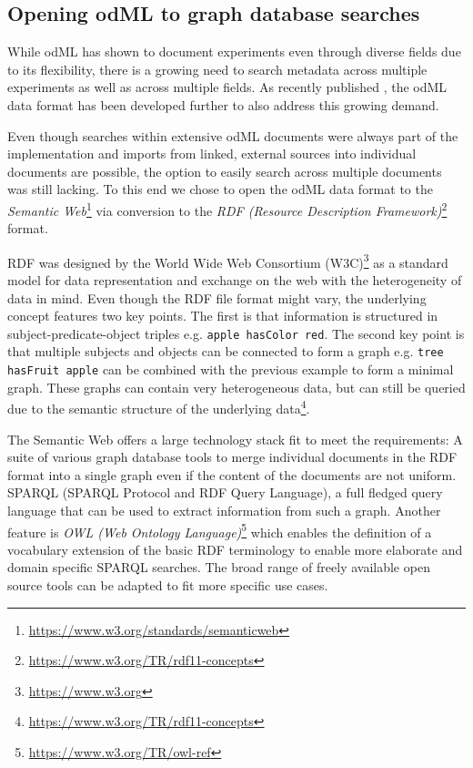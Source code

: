 \documentclass{article}
\begin{document}
\subsection{Opening odML to graph database searches} \label{sec:why_rdf}

While odML has shown to document experiments even through diverse fields due to its flexibility, there is a growing need to search metadata across multiple experiments as well as across multiple fields. As recently published \cite{Sprenger_2019}, the odML data format has been developed further to also address this growing demand.

Even though searches within extensive odML documents were always part of the implementation and imports from linked, external sources into individual documents are possible, the option to easily search across multiple documents was still lacking. To this end we chose to open the odML data format to the \textit{Semantic Web}\footnote{\url{https://www.w3.org/standards/semanticweb}} via conversion to the \textit{RDF (Resource Description Framework)}\footnote{\url{https://www.w3.org/TR/rdf11-concepts}} format.

RDF was designed by the World Wide Web Consortium (W3C)\footnote{\url{https://www.w3.org}} as a standard model for data representation and exchange on the web with the heterogeneity of data in mind. Even though the RDF file format might vary, the underlying concept features two key points. The first is that information is structured in subject-predicate-object triples e.g. \texttt{apple hasColor red}. The second key point is that multiple subjects and objects can be connected to form a graph e.g. \texttt{tree hasFruit apple} can be combined with the previous example to form a minimal graph. These graphs can contain very heterogeneous data, but can still be queried due to the semantic structure of the underlying data\footnote{\url{https://www.w3.org/TR/rdf11-concepts}}.

The Semantic Web offers a large technology stack fit to meet the requirements: A suite of various graph database tools to merge individual documents in the RDF format into a single graph even if the content of the documents are not uniform. SPARQL (SPARQL Protocol and RDF Query Language), a full fledged query language that can be used to extract information from such a graph. Another feature is \textit{OWL (Web Ontology Language)}\footnote{\url{https://www.w3.org/TR/owl-ref}} which enables the definition of a vocabulary extension of the basic RDF terminology to enable more elaborate and domain specific SPARQL searches. The broad range of freely available open source tools can be adapted to fit more specific use cases.
\end{document}
